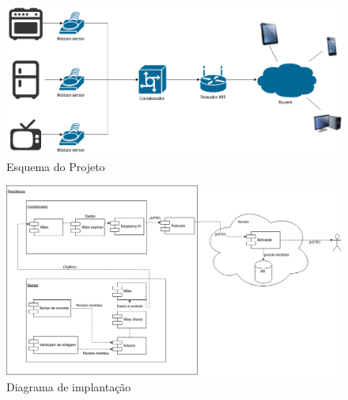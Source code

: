 

\begin{figure}[H]
\centering
\includegraphics[width=1\textwidth]{figuras/esqueminha.png}
\caption{\label{fig:esqueminha} Esquema do Projeto}
\end{figure}

\begin{figure}[H]
\centering
\includegraphics[width=1\textwidth]{figuras/diagrama_implantacao.png}
\caption{\label{fig:diagrama_implantacao} Diagrama de implantação}
\end{figure}
